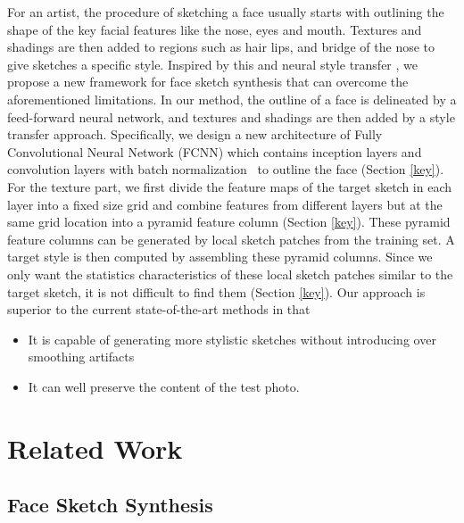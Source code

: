 \documentclass[10pt,twocolumn,letterpaper]{article}
\begin{document}
For an artist, the procedure of sketching a face usually starts with outlining the shape of the key facial features like the nose, eyes and mouth. Textures and shadings are then added to regions such as hair lips, and bridge of the nose to give sketches a specific style. Inspired by this and neural style transfer \cite{gatys2015texture}, we propose a new framework for face sketch synthesis that can overcome the aforementioned limitations. In our method, the outline of a face is delineated by a feed-forward neural network, and textures and shadings are then added by a style transfer approach. Specifically, we design a new architecture of Fully Convolutional Neural Network (FCNN) which contains inception layers \cite{szegedy2015going} and convolution layers with batch normalization~\cite{Sergey2015batch} to outline the face (Section \ref{key}). For the texture part, we first divide the feature maps of the target sketch in each layer into a fixed size grid and combine features from different layers but at the same grid location into a pyramid feature column (Section \ref{key}). These pyramid feature columns can be generated by local sketch patches from the training set. A target style is then computed by assembling these pyramid columns. Since we only want the statistics characteristics of these local sketch patches similar to the target sketch, it is not difficult to find them (Section \ref{key}). Our approach is superior to the current state-of-the-art methods in that 
\begin{itemize}
\item It is capable of generating more stylistic sketches without introducing over smoothing artifacts 
\item It can well preserve the content of the test photo.
\end{itemize}

\section{Related Work}

\subsection{Face Sketch Synthesis}
\end{document}
